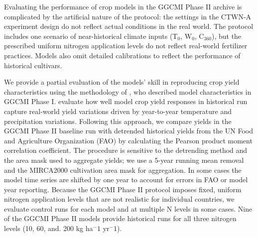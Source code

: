 \documentclass[gmd, manuscript]{copernicus} %
\begin{document}
Evaluating the performance of crop models in the GGCMI Phase II archive is complicated by the artificial nature of the protocol: the settings in the CTWN-A experiment design do not reflect actual conditions in the real world. 
The protocol includes one scenario of near-historical climate inputs (T$_0$, W$_0$, C$_360$), but the prescribed uniform nitrogen application levels do not reflect real-world fertilizer practices. Models also omit detailed calibrations to reflect the performance of historical cultivars. 

We provide a partial evaluation of the models' skill in reproducing crop yield characteristics using the methodology of \citet{muller_global_2017}, who described model characteristics in GGCMI Phase I. 
\citet{muller_global_2017} evaluate how well model crop yield responses in historical run capture real-world yield variations driven by year-to-year temperature and precipitation variations. 
Following this approach, we compare yields in the GGCMI Phase II baseline run with detrended historical yields from the UN Food and Agriculture Organization (FAO) \citep{FAOSTAT} by calculating the Pearson product moment correlation coefficient. 
The procedure is sensitive to the detrending method and the area mask used to aggregate yields; we use a 5-year running mean removal and the MIRCA2000 cultivation area mask for aggregation. 
In some cases the model time series are shifted by one year to account for errors in FAO or model year reporting. 
Because the GGCMI Phase II protocol imposes fixed, uniform nitrogen application levels that are not realistic for individual countries, we evaluate control runs for each model and at multiple N levels in some cases. Nine of the GGCMI Phase II models provide historical runs for all three nitrogen levels (10, 60, and. 200 kg ha$^-1$ yr$^-1$). 

\end{document}
